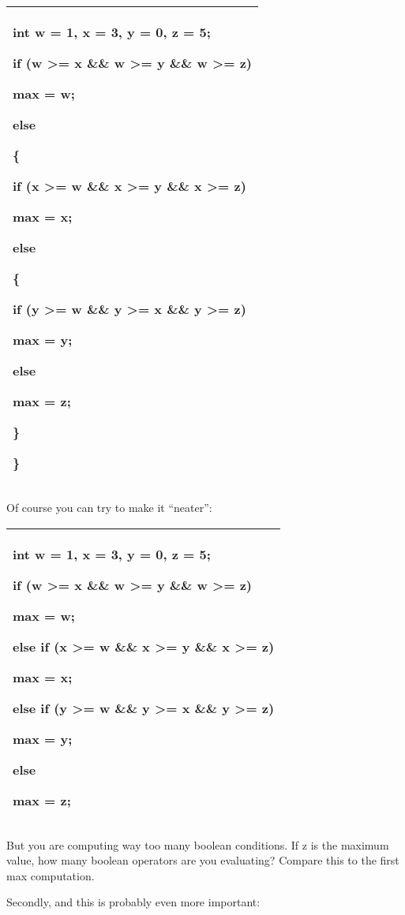 \documentclass[
]{article}
\begin{document}
\begin{longtable}[]{@{}l@{}}
\toprule
\endhead
\begin{minipage}[t]{0.97\columnwidth}\raggedright
int w = 1, x = 3, y = 0, z = 5;

if (w \textgreater= x \&\& w \textgreater= y \&\& w \textgreater= z)

max = w;

else

\{

if (x \textgreater= w \&\& x \textgreater= y \&\& x \textgreater= z)

max = x;

else

\{

if (y \textgreater= w \&\& y \textgreater= x \&\& y \textgreater= z)

max = y;

else

max = z;

\}

\} \strut
\end{minipage}\tabularnewline
\bottomrule
\end{longtable}

Of course you can try to make it ``neater'':

\begin{longtable}[]{@{}l@{}}
\toprule
\endhead
\begin{minipage}[t]{0.97\columnwidth}\raggedright
int w = 1, x = 3, y = 0, z = 5;

if (w \textgreater= x \&\& w \textgreater= y \&\& w \textgreater= z)

max = w;

else if (x \textgreater= w \&\& x \textgreater= y \&\& x \textgreater=
z)

max = x;

else if (y \textgreater= w \&\& y \textgreater= x \&\& y \textgreater=
z)

max = y;

else

max = z; \strut
\end{minipage}\tabularnewline
\bottomrule
\end{longtable}

But you are computing way too many boolean conditions. If z is the
maximum value, how many boolean operators are you evaluating? Compare
this to the first max computation.

Secondly, and this is probably even more important:
\end{document}

